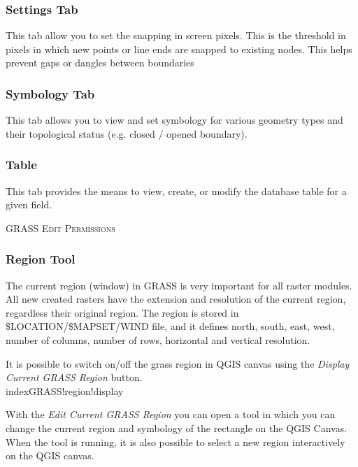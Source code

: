 \subsubsection{Settings Tab} 
This tab allow you to set the snapping in screen pixels. This is the threshold in pixels in which new points or line ends are snapped to existing nodes. This helps prevent gaps or dangles between boundaries

\subsubsection{Symbology Tab}
This tab allows you to view and set symbology for various geometry types and their topological status (e.g. closed / opened boundary).

\subsubsection{Table} 
This tab provides the means to view, create, or modify the database table for a given field.
\begin{Tip}\caption{\textsc{GRASS Edit Permissions}}
\end{Tip} 

\subsubsection{Region Tool}

The current region (window) in GRASS is very important for all 
raster modules. All new created rasters have the extension and resolution
of the current region, regardless their original region. 
The region is stored in \$LOCATION/\$MAPSET/WIND file, and it defines
north, south, east, west, number of columns, number of rows, 
horizontal and vertical resolution.

It is possible to switch on/off the grass region in QGIS canvas
using the \textsl{Display Current GRASS Region}
button.\\index{GRASS!region!display}\

With the \textsl{Edit Current GRASS Region} you can open a tool 
in which you can change the current region and symbology
of the rectangle on the QGIS Canvas. When the tool is running,
it is also possible to select a new region interactively
on the QGIS canvas.

